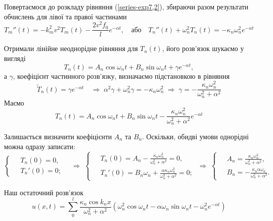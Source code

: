 Повертаємося до розкладу рівняння (\ref{series-exp7,2}), збираючи разом результати обчислень для лівої та правої частинами
\begin{equation}
    T_m''(t) = - k_m^2v^2 T_m(t)  - \frac{2v^2 f_0}{l} e^{-\alpha t}, \quad \text{або} \quad T_n''(t) + \omega_n^2 T_n(t) = - \kappa_n \omega_n^2  e^{-\alpha t}
\end{equation}

Отримали лінійне неоднорідне рівняння для $T_n(t)$, його розв'язок шукаємо у вигляді
\begin{equation}
    T_n(t) = A_n \cos\omega_nt + B_n \sin\omega_nt + \gamma e^{-\alpha t},
\end{equation}
а $\gamma$, коефіцієнт частинного розв'язку, визначаємо підстановкою в рівняння
\begin{equation*}
    \widetilde{T}_n(t) = \gamma e^{-\alpha t} 
    \quad\Rightarrow\;
    \alpha^2\gamma + \omega_n^2\gamma = - \kappa_n \omega_n^2
    \;\Rightarrow\;
    \gamma = - \frac{\kappa_n \omega_n^2}{\omega_n^2 + \alpha^2}
\end{equation*} 
Маємо
\begin{equation}
    T_n(t) = A_n \cos\omega_nt + B_n \sin\omega_nt - \frac{\kappa_n \omega_n^2}{\omega_n^2 + \alpha^2} e^{-\alpha t}
\end{equation}

Залишається визначити коефіцієнти $A_n$ та $B_n$. Оскільки, обидві умови однорідні можна одразу записати:
\begin{equation*}
    \left\{ \begin{aligned}
        \;&T_n(0) = 0,\\
        &T_n'(0) = 0; 
    \end{aligned} \right.
    \quad\Rightarrow\;
    \left\{ \begin{aligned}
        \;&T_n(0) = A_n - \frac{\kappa_n \omega_n^2}{\omega_n^2 + \alpha^2} = 0,\\
        &T_n'(0) = B_n\omega_n + \frac{\alpha \kappa_n \omega_n^2}{\omega_n^2 + \alpha^2} = 0; 
    \end{aligned} \right.
    \;\Rightarrow\;
    \left\{ \begin{aligned}
        \;&A_n = \frac{\kappa_n \omega_n^2}{\omega_n^2 + \alpha^2},\\
        &B_n = - \frac{\kappa_n \alpha \omega_n}{\omega_n^2 + \alpha^2}. 
    \end{aligned} \right.
\end{equation*}

Наш остаточний розв'язок 
\begin{equation}
    u(x,t) = \sum\limits_0^l \frac{\kappa_n \cos k_nx}{\omega_n^2 + \alpha^2} \left(\omega_n^2 \cos\omega_nt - \alpha \omega_n \sin\omega_nt - \omega_n^2 e^{-\alpha t} \right)
\end{equation}

%